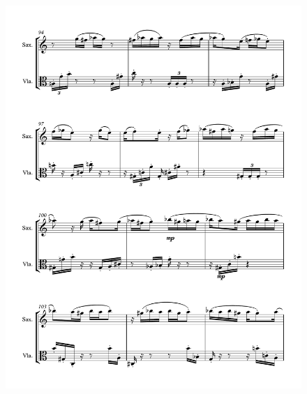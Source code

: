 \begin{figure}[htbp]
    \centering
	\includegraphics[width=6.5in]{figures/Sax_Viola_9.pdf}
\end{figure}

